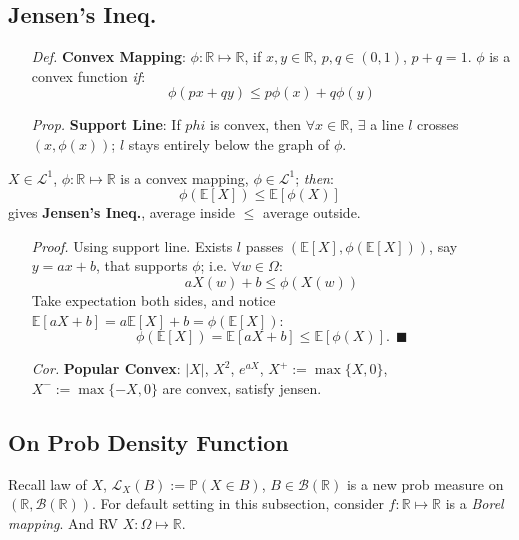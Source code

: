 \documentclass[a4paper,12pt,twoside]{book}
\begin{document}
\subsection{Jensen's Ineq.}
\begin{itemize}
	\item[\textit{Def.}] \textbf{Convex Mapping}: $\phi: \mathbb{R}\mapsto \mathbb{R}$, if $x,y\in \mathbb{R}$, $p,q\in (0,1)$, $p+q=1$. $\phi$ is a convex function \textit{if}:
	\begin{equation}
		\phi(px+qy)\leq p\phi(x)+q\phi(y)
	\end{equation}

	\item[\textit{Prop.}] \textbf{Support Line}: If $phi$ is convex, then $\forall x \in \mathbb{R}$, $\exists$ a line $l$ crosses $(x, \phi(x))$; $l$ stays entirely below the graph of $\phi$.
\end{itemize}

$X\in \mathcal{L}^1$, $\phi: \mathbb{R}\mapsto \mathbb{R}$ is a convex mapping, $\phi\in \mathcal{L}^1$; \textit{then}:
\begin{equation}
	\phi(\mathbb{E}\left[X\right])\leq \mathbb{E}\left[\phi(X)\right]
\end{equation}
gives \textbf{Jensen's Ineq.}, average inside $\leq$ average outside.

\begin{itemize}
	\item[\textit{Proof.}] Using support line. Exists $l$ passes $(\mathbb{E}\left[X\right], \phi(\mathbb{E}\left[X\right]))$, say $y=ax+b$, that supports $\phi$; i.e. $\forall w\in \Omega$:
	\begin{equation}
		aX(w)+b\leq \phi(X(w))
	\end{equation}
	Take expectation both sides, and notice $\mathbb{E}\left[aX+b\right]=a \mathbb{E}\left[X\right]+b = \phi(\mathbb{E}\left[X\right])$:
	\begin{equation}
		\phi(\mathbb{E}\left[X\right])=\mathbb{E}\left[aX+b\right] \leq \mathbb{E}\left[\phi(X)\right].~~\blacksquare
	\end{equation}

	\item[\textit{Cor.}] \textbf{Popular Convex}: $|X|$, $X^2$, $e^{aX}$, $X^+:=\max\{X,0\}$, $X^-:=\max\{-X,0\}$ are convex, satisfy jensen.
\end{itemize}

\subsection{On Prob Density Function}
Recall law of $X$, $\mathcal{L}_X(B):=\mathbb{P}(X\in B)$, $B\in\mathscr{B}(\mathbb{R})$ is a new prob measure on $(\mathbb{R},\mathscr{B}(\mathbb{R}))$. For default setting in this subsection, consider $f:\mathbb{R}\mapsto \mathbb{R}$ is a \textit{Borel mapping}. And RV $X: \Omega\mapsto \mathbb{R}$. 
\end{document}
